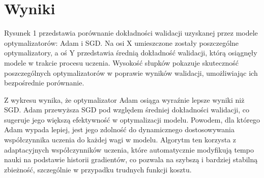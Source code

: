\documentclass[polish,11pt,a4paper]{article}
\begin{document}
\section{Wyniki}

Rysunek 1 przedstawia porównanie dokładności walidacji uzyskanej przez modele optymalizatorów: Adam i SGD. Na osi X umieszczone zostały poszczególne optymalizatory, a oś Y przedstawia średnią dokładność walidacji, którą osiągnęły modele w trakcie procesu uczenia. Wysokość słupków pokazuje skuteczność poszczególnych optymalizatorów w poprawie wyników walidacji, umożliwiając ich bezpośrednie porównanie.

Z wykresu wynika, że optymalizator Adam osiąga wyraźnie lepsze wyniki niż SGD. Adam przewyższa SGD pod względem średniej dokładności walidacji, co sugeruje jego większą efektywność w optymalizacji modelu. Powodem, dla którego Adam wypada lepiej, jest jego zdolność do dynamicznego dostosowywania współczynnika uczenia do każdej wagi w modelu. Algorytm ten korzysta z adaptacyjnych współczynników uczenia, które automatycznie modyfikują tempo nauki na podstawie historii gradientów, co pozwala na szybszą i bardziej stabilną zbieżność, szczególnie w przypadku trudnych funkcji kosztu.
\end{document}
